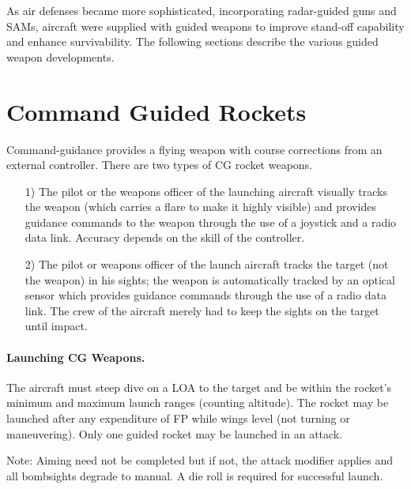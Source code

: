 


As air defenses became more sophisticated, incorporating radar-guided guns and SAMs, aircraft were supplied with guided weapons to improve stand-off capability and enhance survivability. The following sections describe the various guided weapon developments.

\section{Command Guided Rockets}

Command-guidance provides a flying weapon with course corrections from an external controller. There are two types of CG rocket weapons.

\begin{enumerate}

    \item[1)] The pilot or the weapons officer of the launching aircraft visually tracks the weapon (which carries a flare to make it highly visible) and provides guidance commands to the weapon through the use of a joystick and a radio data link. Accuracy depends on the skill of the controller.

    \item[2)] The pilot or weapons officer of the launch aircraft tracks the target (not the weapon) in his sights; the weapon is automatically tracked by an optical sensor which provides guidance commands through the use of a radio data link. The crew of the aircraft merely had to keep the sights on the target until impact.

\end{enumerate}

\paragraph{Launching CG Weapons.} The aircraft must steep dive on a LOA to the target and be within the rocket's minimum and maximum launch ranges (counting altitude). The rocket may be launched after any expenditure of FP while wings level (not turning or maneuvering). Only one guided rocket may be launched in an attack. 

Note: Aiming need not be completed but if not, the  attack modifier applies and all bombsights degrade to manual. A die roll is required for successful launch.

